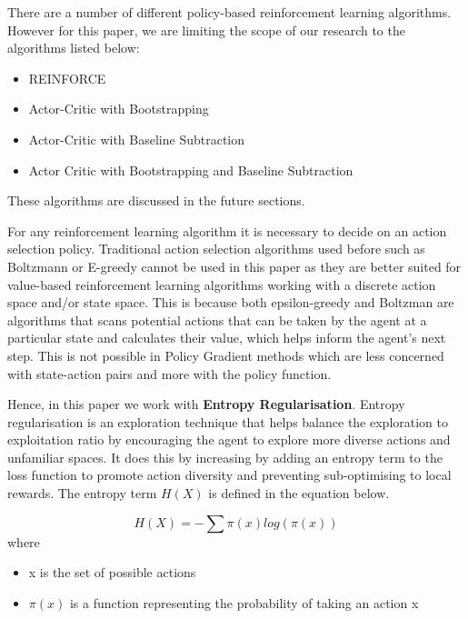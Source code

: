 \documentclass{article}
\begin{document}
\par
There are a number of different policy-based reinforcement learning algorithms. However for this paper, we are limiting the scope of our research to the algorithms listed below: 

\begin{itemize}[itemsep=0.0pt]
\item REINFORCE
\item Actor-Critic with Bootstrapping
\item Actor-Critic with Baseline Subtraction
\item Actor Critic with Bootstrapping and Baseline Subtraction
\end{itemize}
These algorithms are discussed in the future sections. 

\par For any reinforcement learning algorithm it is necessary to decide on an action selection policy. Traditional action selection algorithms used before such as Boltzmann or E-greedy cannot be used in this paper as they are better suited for value-based reinforcement learning algorithms working with a discrete action space and/or state space. This is because both epsilon-greedy and Boltzman are algorithms that scans potential actions that can be taken by the agent at a particular state and calculates their value, which helps inform the agent's next step. This is not possible in Policy Gradient methods which are less concerned with state-action pairs and more with the policy function. 
\par Hence, in this paper we work with \textbf{Entropy Regularisation}. Entropy regularisation is an exploration technique that helps balance the exploration to exploitation ratio by encouraging the agent to explore more diverse actions and unfamiliar spaces. It does this by increasing by adding an entropy term to the loss function to promote action diversity and preventing sub-optimising to local rewards. The entropy term $H(X)$ is defined in the equation below. %

\begin{equation*}
H(X) = - \sum \pi(x) log(\pi(x)) %
\end{equation*}
where
\begin{itemize}[itemsep=0.0pt]
\renewcommand\labelitemi{.}
\item x is the set of possible actions
\item $\pi(x)$ is a function representing the probability of taking an action x
\end{itemize}
\end{document}
